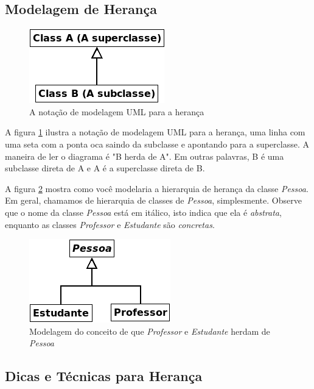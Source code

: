 \documentclass[
	11pt,				%
	openright,
	twoside,			%
	a4paper,			%
	english,			%
	french,
	brazil,				%
	sumario=tradicional
	]{abntex2}
\begin{document}
\subsection{Modelagem de Herança}

\begin{figure}
\begin{center}
\includegraphics[scale=0.8]{uml1.png} 
\caption{A notação de modelagem UML para a herança} \label{fig:uml1}
\end{center}
\end{figure}

A figura \ref{fig:uml1} ilustra a notação de modelagem UML para a herança, uma linha com uma seta com a ponta oca saindo da subclasse e apontando para a superclasse. A maneira de ler o diagrama é "B herda de A". Em outras palavras, B é uma subclasse direta de A e A é a superclasse direta de B.

A figura \ref{fig:uml2} mostra como você modelaria a hierarquia de herança da classe \emph{Pessoa}. Em geral, chamamos de hierarquia de classes de \emph{Pessoa}, simplesmente. Observe que o nome da classe \emph{Pessoa} está em itálico, isto indica que ela é \textit{abstrata}, enquanto as classes \emph{Professor} e \emph{Estudante} são \textit{concretas}.

\begin{figure}[h]
\begin{center}
\includegraphics[scale=0.8]{uml2.png} 
\caption{Modelagem do conceito de que \emph{Professor} e \emph{Estudante} herdam de \emph{Pessoa}} \label{fig:uml2}
\end{center}
\end{figure}

\subsection{Dicas e Técnicas para Herança}
\end{document}
